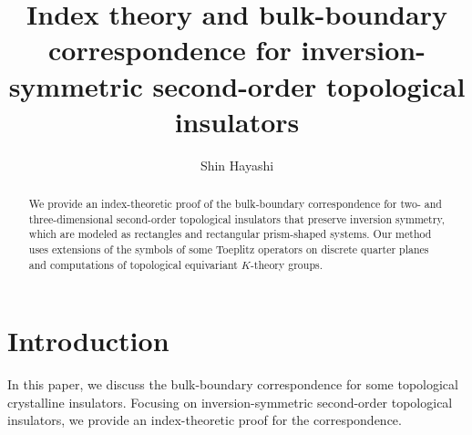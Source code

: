 \documentclass{amsart}
\theoremstyle{plain}
\theoremstyle{definition}
\theoremstyle{remark}
\begin{document}
\title[Index theory and second-order bulk-boundary correspondence]
{Index theory and bulk-boundary correspondence for inversion-symmetric second-order topological insulators}

\author[S. Hayashi]{Shin Hayashi}
\address{Department of Mathematical Sciences, Aoyama Gakuin University, 5-10-1 Fuchinobe, Chuo, Sagamihara, Kanagawa 252-5258, Japan}
\address{Advanced Institute for Materials Research, Tohoku University, 2-1-1 Katahira, Aoba, Sendai 980-8577 Japan}
\address{RIKEN Center for Interdisciplinary Theoretical and Mathematical Sciences(iTHEMS), RIKEN, Wako 351-0198, Japan}


\begin{abstract}
We provide an index-theoretic proof of the bulk-boundary correspondence for two- and three-dimensional second-order topological insulators that preserve inversion symmetry, which are modeled as rectangles and rectangular prism-shaped systems.
Our method uses extensions of the symbols of some Toeplitz operators on discrete quarter planes and computations of topological equivariant $K$-theory groups.
\end{abstract}

\maketitle
\setcounter{tocdepth}{1}
\tableofcontents

\section{Introduction}
In this paper, we discuss the bulk-boundary correspondence for some topological crystalline insulators.
Focusing on inversion-symmetric second-order topological insulators, we provide an index-theoretic proof for the correspondence.
\end{document}
